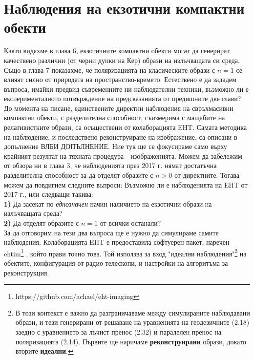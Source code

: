 \section{Наблюдения на екзотични компактни обекти}
Както видяхме в глава 6, екзотичните компактни обекти могат да генерират качествено различни (от черни дупки на Кер) образи на излъчващата си среда. Също в глава 7 показахме, че поляризацията на класическите образи с $n = 1$ се влияят силно от природата на пространство-времето. Естествено е да зададем въпроса, имайки предвид съвременните ни наблюдателни техники, възможно ли е експерименталното потвърждение на предсказанията от предишните две глави?\\

До момента на писане, единствените директни наблюдения на свръхмасивни компактни обекти, с разделителна способност, съизмерима с мащабите на релативистките образи, са осъществени от колаборацията EHT. Самата методика на наблюдение, и последствено реконструиране на изображение, са описани в допълнение ВЛБИ ДОПЪЛНЕНИЕ. Ние тук ще се фокусираме само върху крайният резултат на тяхната процедура - изображенията. Можем да забележим от обзора ни в глава 3, че наблюденията през 2017 г. нямат достатъчна разделителна способност за да отделят образите с $n > 0 $ от директните. Тогава можем да повдигнем следните въпроси: Възможно ли е наблюденията на EHT от 2017 г., или следващи такива:\\

\textbf{1)} Да засекат по \emph{еднозначен} начин наличието на екзотични образи на излъчващата среда?\\

\textbf{2)} Да отделят образите с $n = 1$ от всички останали?\\

За да отговорим на тези два въпроса ще е нужно да симулираме самите наблюдения. Колаборацията EHT е предоставила софтуерен пакет, наречен ehtim\footnote{https://github.com/achael/eht-imaging} \cite{EHTIM}, който прави точно това. Той използва за вход "идеални наблюдения"\footnote{В този контекст е важно да разграничаваме между симулираните наблюдавани образи, и тези генерирани от решаване на уравненията на геодезичните (2.18) заедно с уравнението за лъчист пренос (2.32) и паралелен пренос на поляризацията (2.14). Първите ще наричаме \textbf{реконструирани} образи, докато вторите \textbf{идеални}.} на обектите, конфигурация от радио телескопи, и настройки на алгоритъма за реконструкция. \\

